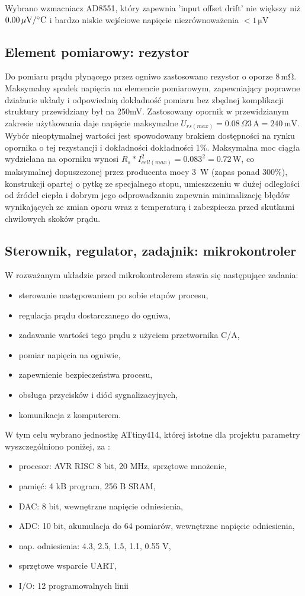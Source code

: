 \documentclass[polish,engineer]{polsl-msth}
\begin{document}
Wybrano wzmacniacz AD8551, który zapewnia 'input offset drift' nie większy niż $\mathrm{0.00\, \mu V/\degree C}$ i bardzo niskie wejściowe napięcie niezrównoważenia $\mathrm{<1\,\mu V}$
\subsection{Element pomiarowy: rezystor}
Do pomiaru prądu płynącego przez ogniwo zastosowano rezystor o oporze $\mathrm{8\,m\Omega}$. Maksymalny spadek napięcia na elemencie pomiarowym, zapewniający poprawne działanie układy i odpowiednią dokładność pomiaru bez zbędnej komplikacji struktury przewidziany był na 250mV. Zastosowany opornik w przewidzianym zakresie użytkowania daje napięcie maksymalne $U_{rs(max)}=0.08\,\Omega 3\,\mathrm{A = 240\,mV}$. Wybór nieoptymalnej wartości jest spowodowany brakiem dostępności na rynku opornika o tej rezystancji i dokładności dokładności 1\%. Maksymalna moc ciągła wydzielana na oporniku wynosi $R_s*I_{cell(max)}^2 = 0.08 3^2 = 0.72\,\mathrm{W}$, co maksymalnej dopuszczonej przez producenta mocy 3~W (zapas ponad 300\%), konstrukcji opartej o pytkę ze specjalnego stopu, umieszczeniu w dużej odległości od źródeł ciepła i dobrym jego odprowadzaniu zapewnia minimalizację błędów wynikających ze zmian oporu wraz z temperaturą i zabezpiecza przed skutkami chwilowych skoków prądu.
\subsection{Sterownik, regulator, zadajnik: mikrokontroler}
W rozważanym układzie przed mikrokontrolerem stawia się następujące zadania:
\begin{itemize}
    \item sterowanie następowaniem po sobie etapów procesu,
    \item regulacja prądu dostarczanego do ogniwa,
    \item zadawanie wartości tego prądu z użyciem przetwornika C/A,
    \item pomiar napięcia na ogniwie,
    \item zapewnienie bezpieczeństwa procesu,
    \item obsługa przycisków i diód sygnalizacyjnych,
    \item komunikacja z komputerem.
\end{itemize}
W tym celu wybrano jednostkę ATtiny414, której istotne dla projektu parametry wyszczególniono poniżej, za \cite{tiny414datasheet}:
\begin{itemize}
    \item procesor: AVR RISC 8 bit, 20 MHz, sprzętowe mnożenie,
    \item pamięć: 4 kB program, 256 B SRAM,
    \item DAC: 8 bit, wewnętrzne napięcie odniesienia,
    \item ADC: 10 bit, akumulacja do 64 pomiarów, wewnętrzne napięcie odniesienia, 
    \item nap. odniesienia: 4.3, 2.5, 1.5, 1.1, 0.55 V,
    \item sprzętowe wsparcie UART,
    \item I/O: 12 programowalnych linii
\end{itemize}
\end{document}
